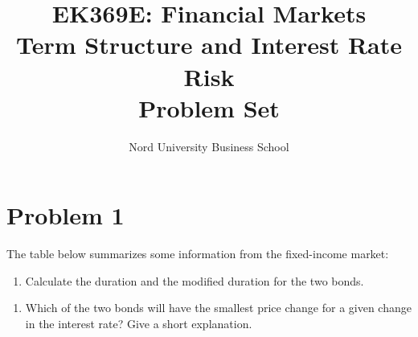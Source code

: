 \documentclass[12]{article}
\title{EK369E: Financial Markets\\ Term Structure and Interest Rate Risk\\ Problem Set}
\author{Nord University Business School}
\date{}
\begin{document}
\maketitle



\section*{Problem 1}
The table below summarizes some information from the fixed-income market:
\begin{table}[H]
\centering
{}
\label{tab:my-table}
\end{table}

\begin{enumerate}
    \item[a)] Calculate the duration and the modified duration for the two bonds.
\end{enumerate}






\color{black}
\begin{enumerate}
    \item[b)] Which of the two bonds will have the smallest price change for a given change in the interest rate? Give a short explanation.
\end{enumerate}
\end{document}
